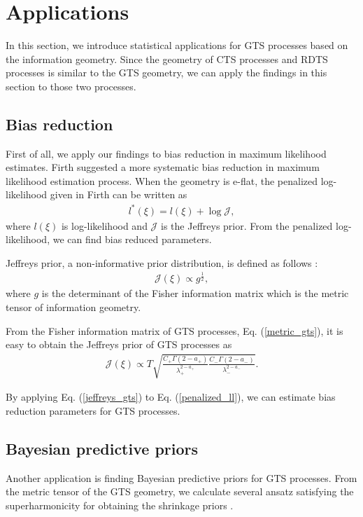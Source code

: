 \documentclass[preprint,11pt]{amsart}
\begin{document}
\section{Applications}
\label{sec_apps}
	In this section, we introduce statistical applications for GTS processes based on the information geometry. Since the geometry of CTS processes and RDTS processes is similar to the GTS geometry, we can apply the findings in this section to those two processes.

\subsection{Bias reduction}
	First of all, we apply our findings to bias reduction in maximum likelihood estimates. Firth \cite{firth1993bias} suggested a more systematic bias reduction in maximum likelihood estimation process. When the geometry is e-flat, the penalized log-likelihood given in Firth \cite{firth1993bias} can be written as
	\begin{align}
	\label{penalized_ll}
		l^{*}(\xi)=l(\xi)+\log \mathcal{J},
	\end{align}
	where $l(\xi)$ is log-likelihood and $\mathcal{J}$ is the Jeffreys prior. From the penalized log-likelihood, we can find bias reduced parameters.
	
	Jeffreys prior, a non-informative prior distribution, is defined as follows \cite{jeffreys1946invariant}:
	\begin{align}
		\mathcal{J}(\xi)\propto g^{\frac{1}{2}},
	\end{align}
	where $g$ is the determinant of the Fisher information matrix which is the metric tensor of information geometry.
	
	From the Fisher information matrix of GTS processes, Eq. (\ref{metric_gts}), it is easy to obtain the Jeffreys prior of GTS processes as
	\begin{align}
		\label{jeffreys_gts}
		\mathcal{J}(\xi)\propto T\sqrt{\frac{C_+\Gamma(2-a_+)}{\lambda_+^{2-a_+}} \frac{C_-\Gamma(2-a_-)}{\lambda_-^{2-a_-}}}.
	\end{align}
	
	By applying Eq. (\ref{jeffreys_gts}) to Eq. (\ref{penalized_ll}), we can estimate bias reduction parameters for GTS processes.
	
\subsection{Bayesian predictive priors}
	Another application is finding Bayesian predictive priors for GTS processes. From the metric tensor of the GTS geometry, we calculate several ansatz satisfying the superharmonicity for obtaining the shrinkage priors \cite{komaki2006shrinkage}.
		
\end{document}
